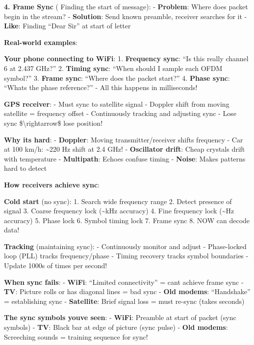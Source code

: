 \textbf{4. Frame Sync} ( Finding the start of message): -
\textbf{Problem}: Where does packet begin in the stream? -
\textbf{Solution}: Send known preamble, receiver searches for it -
\textbf{Like}: Finding ``Dear Sir'' at start of letter

\textbf{Real-world examples}:

\textbf{Your phone connecting to WiFi}: 1. \textbf{Frequency sync}: ``Is
this really channel 6 at 2.437 GHz?'' 2. \textbf{Timing sync}: ``When
should I sample each OFDM symbol?'' 3. \textbf{Frame sync}: ``Where does
the packet start?'' 4. \textbf{Phase sync}: ``What\textquotesingle s the
phase reference?'' - All this happens in milliseconds!

\textbf{GPS receiver}: - Must sync to satellite signal - Doppler shift
from moving satellite = frequency offset - Continuously tracking and
adjusting sync - Lose sync \$\textbackslash rightarrow\$ lose position!

\textbf{Why it\textquotesingle s hard}: - \textbf{Doppler}: Moving
transmitter/receiver shifts frequency - Car at 100 km/h:
\textasciitilde220 Hz shift at 2.4 GHz! - \textbf{Oscillator drift}:
Cheap crystals drift with temperature - \textbf{Multipath}: Echoes
confuse timing - \textbf{Noise}: Makes patterns hard to detect

\textbf{How receivers achieve sync}:

\textbf{Cold start} (no sync): 1. Search wide frequency range 2. Detect
presence of signal 3. Coarse frequency lock (\textasciitilde kHz
accuracy) 4. Fine frequency lock (\textasciitilde Hz accuracy) 5. Phase
lock 6. Symbol timing lock 7. Frame sync 8. NOW can decode data!

\textbf{Tracking} (maintaining sync): - Continuously monitor and adjust
- Phase-locked loop (PLL) tracks frequency/phase - Timing recovery
tracks symbol boundaries - Update 1000s of times per second!

\textbf{When sync fails}: - \textbf{WiFi}: ``Limited connectivity'' =
can\textquotesingle t achieve frame sync - \textbf{TV}: Picture rolls or
has diagonal lines = bad sync - \textbf{Old modems}: ``Handshake'' =
establishing sync - \textbf{Satellite}: Brief signal loss = must re-sync
(takes seconds)

\textbf{The sync symbols you\textquotesingle ve seen}: - \textbf{WiFi}:
Preamble at start of packet (sync symbols) - \textbf{TV}: Black bar at
edge of picture (sync pulse) - \textbf{Old modems}: Screeching sounds =
training sequence for sync!

